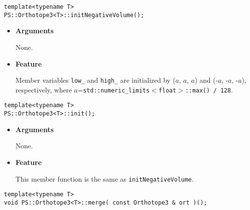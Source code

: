 \begin{screen}
\begin{verbatim}
template<typename T>
PS::Orthotope3<T>::initNegativeVolume();
\end{verbatim}
\end{screen}

\begin{itemize}

\item{{\bf Arguments}}

None.

\item{{\bf Feature}}

Member variables \texttt{low\_} and \texttt{high\_} are initialized by ($a$, $a$, $a$) and (-$a$, -$a$, -$a$), respectively,
where $a$=\texttt{std::numeric\_limits$<$float$>$::max() / 128}.

\end{itemize}

\begin{screen}
\begin{verbatim}
template<typename T>
PS::Orthotope3<T>::init();
\end{verbatim}
\end{screen}

\begin{itemize}

\item{{\bf Arguments}}

None.

\item{{\bf Feature}}

This member function is the same as \texttt{initNegativeVolume}.

\end{itemize}

\begin{screen}
\begin{verbatim}
template<typename T>
void PS::Orthotope3<T>::merge( const Orthotope3 & ort )();
\end{verbatim}
\end{screen}

